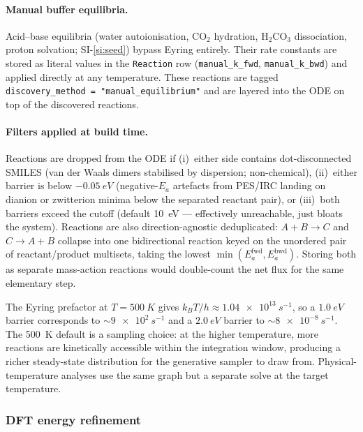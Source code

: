 \paragraph{Manual buffer equilibria.}
Acid--base equilibria (water autoionisation, CO$_2$ hydration, H$_2$CO$_3$ dissociation, proton solvation; SI-\ref{si:seed}) bypass Eyring entirely. Their rate constants are stored as literal values in the \texttt{Reaction} row (\texttt{manual\_k\_fwd}, \texttt{manual\_k\_bwd}) and applied directly at any temperature. These reactions are tagged \texttt{discovery\_method = "manual\_equilibrium"} and are layered into the ODE on top of the discovered reactions.

\paragraph{Filters applied at build time.}
Reactions are dropped from the ODE if (i)~either side contains dot-disconnected SMILES (van der Waals dimers stabilised by dispersion; non-chemical), (ii)~either barrier is below $-\SI{0.05}{eV}$ (negative-$E_a$ artefacts from PES/IRC landing on dianion or zwitterion minima below the separated reactant pair), or (iii)~both barriers exceed the cutoff (default \SI{10}{eV} --- effectively unreachable, just bloats the system). Reactions are also direction-agnostic deduplicated: $A + B \to C$ and $C \to A + B$ collapse into one bidirectional reaction keyed on the unordered pair of reactant/product multisets, taking the lowest $\min(E_a^\text{fwd}, E_a^\text{bwd})$. Storing both as separate mass-action reactions would double-count the net flux for the same elementary step.

The Eyring prefactor at $T = \SI{500}{K}$ gives $k_B T / h \approx \SI{1.04e13}{s^{-1}}$, so a $\SI{1.0}{eV}$ barrier corresponds to $\sim \SI{9e2}{s^{-1}}$ and a $\SI{2.0}{eV}$ barrier to $\sim \SI{8e-8}{s^{-1}}$. The \SI{500}{K} default is a sampling choice: at the higher temperature, more reactions are kinetically accessible within the integration window, producing a richer steady-state distribution for the generative sampler to draw from. Physical-temperature analyses use the same graph but a separate solve at the target temperature.


\subsubsection{DFT energy refinement}
\label{sec:kinetics-dft}


